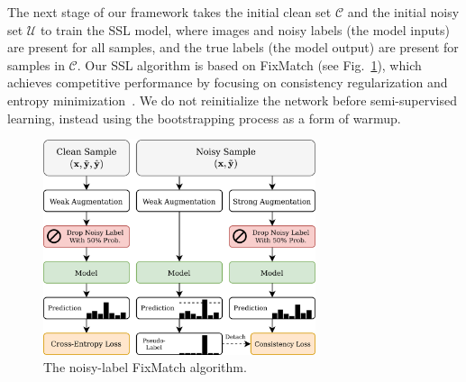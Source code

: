 \documentclass[10pt,twocolumn,letterpaper]{article}
\begin{document}
The next stage of our framework takes the initial clean set $\mathcal{C}$ and the initial noisy set $\mathcal{U}$ 
to train the SSL model, where images and noisy labels (the model inputs) are present for all samples, and the true labels (the model output) are present for samples in $\mathcal{C}$. 
Our SSL algorithm is based on FixMatch (see Fig.~\ref{fig:fixmatch}), which achieves competitive performance by focusing on consistency regularization and entropy minimization~\cite{sohn2020fixmatch}. We do not reinitialize the network before semi-supervised learning, instead using the bootstrapping process as a form of warmup.

\begin{figure}[ht!]
    \begin{center}
    \includegraphics[width = 8.0cm]{Figures/FixMatch2.drawio.png}
    \end{center}
    \caption{\small The noisy-label  FixMatch algorithm.}
    \label{fig:fixmatch}
\end{figure}
\end{document}
